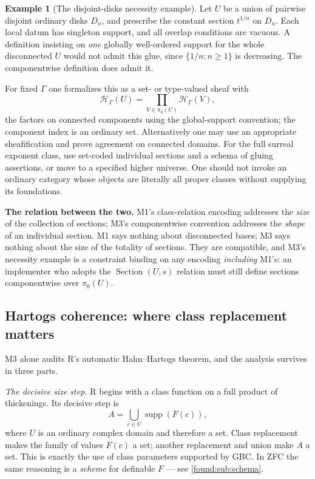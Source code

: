 \documentclass[11pt,letterpaper]{article}
\numberwithin{equation}{section}
\theoremstyle{definition}
\newtheorem{example}[theorem]{Example}
\theoremstyle{remark}
\newcommand{\HH}{\mathcal H}
\newcommand{\supp}{\operatorname{supp}}
\begin{document}
\begin{example}[The disjoint-disks necessity example]\label{found:ex:disjointdisks}
Let $U$ be a union of pairwise disjoint ordinary disks $D_n$, and prescribe the
constant section $t^{1/n}$ on $D_n$. Each local datum has singleton support, and
all overlap conditions are vacuous. A definition insisting on \emph{one} globally
well-ordered support for the whole disconnected $U$ would not admit this glue,
since $\{1/n:n\ge1\}$ is decreasing. The componentwise definition does admit it.
\end{example}

For fixed $\Gamma$ one formalizes this as a set- or type-valued sheaf with
\begin{equation}\label{found:eq:componentwise}
 \HH_\Gamma(U)=\prod_{V\in\pi_0(U)}\HH_\Gamma(V),
\end{equation}
the factors on connected components using the global-support convention; the
component index is an ordinary set. Alternatively one may use an appropriate
sheafification and prove agreement on connected domains. For the full surreal
exponent class, use set-coded individual sections and a schema of gluing
assertions, or move to a specified higher universe. One should not invoke an
ordinary category whose objects are literally all proper classes without
supplying its foundations.

\medskip\noindent
\textbf{The relation between the two.} M1's class-relation encoding addresses the
\emph{size} of the collection of sections; M3's componentwise convention
addresses the \emph{shape} of an individual section. M1 says nothing about
disconnected bases; M3 says nothing about the size of the totality of sections.
They are compatible, and M3's necessity example is a constraint binding on any
encoding \emph{including} M1's: an implementer who adopts the
$\operatorname{Section}(U,s)$ relation must still define sections componentwise
over $\pi_0(U)$.

\subsection{Hartogs coherence: where class replacement matters}
\label{found:sub:hartogs}
M3 alone audits R's automatic Hahn--Hartogs theorem, and the analysis survives
in three parts.

\emph{The decisive size step.} R begins with a class function on a full product
of thickenings. Its decisive step is
\begin{equation}\label{found:eq:hartogssupport}
 A=\bigcup_{c\in U}\supp(F(c)),
\end{equation}
where $U$ is an ordinary complex domain and therefore a set. Class replacement
makes the family of values $F(c)$ a set; another replacement and union make $A$
a set. This is exactly the use of class parameters supported by GBC. In ZFC the
same reasoning is a \emph{scheme} for definable $F$ --- see
\cref{found:sub:schema}.
\end{document}
